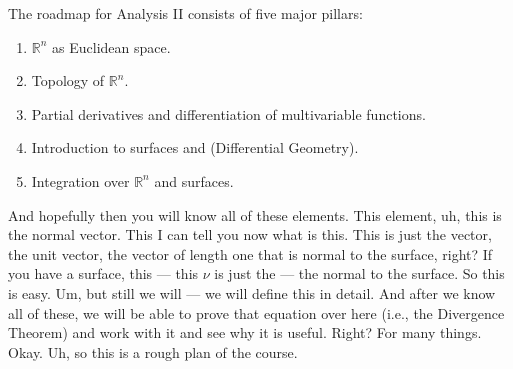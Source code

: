 \begin{math-stroke}
The roadmap for Analysis II consists of five major pillars:
\begin{enumerate}
    \setcounter{enumi}{0} \item $\mathbb{R}^n$ as Euclidean space.
    \setcounter{enumi}{1} \item Topology of $\mathbb{R}^n$.
    \setcounter{enumi}{2} \item Partial derivatives and differentiation of multivariable functions.
    \setcounter{enumi}{3} \item Introduction to surfaces and  (Differential Geometry).
    \setcounter{enumi}{4} \item Integration over $\mathbb{R}^n$ and surfaces.
\end{enumerate}
\end{math-stroke}

\begin{spoken-clean}[00:21:13 - 00:22:00]
And hopefully then you will know all of these elements. This element, uh, this is the normal vector. This I can tell you now what is this. This is just the vector, the unit vector, the vector of length one that is normal to the surface, right? If you have a surface, this — this $\nu$ is just the — the normal to the surface. So this is easy. Um, but still we will — we will define this in detail. And after we know all of these, we will be able to prove that equation over here (i.e., the Divergence Theorem) and work with it and see why it is useful. Right? For many things. Okay. Uh, so this is a rough plan of the course.
\end{spoken-clean}

\begin{math-stroke}
\begin{center}
\end{center}
\end{math-stroke}

